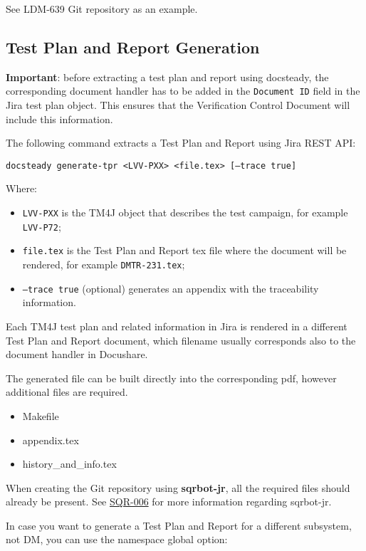 \documentclass[DM]{lsstdoc}
\begin{document}
See LDM-639 Git repository as an example.


\subsection{Test Plan and Report Generation}

\textbf{Important}: before extracting a test plan and report using docsteady,
the corresponding document handler has to be added in the \texttt{Document ID} field in the Jira test plan object.
This ensures that the Verification Control Document will include this information.

The following command extracts a Test Plan and Report using Jira REST API:

\texttt{docsteady generate-tpr <LVV-PXX> <file.tex> [--trace true]}

Where:

\begin{itemize}
\item \texttt{LVV-PXX} is the TM4J object that describes the test campaign, for example \texttt{LVV-P72};
\item \texttt{file.tex} is the Test Plan and Report tex file where the document will be rendered, for example \texttt{DMTR-231.tex};
\item \texttt{--trace true} (optional) generates an appendix with the traceability information.
\end{itemize}

Each TM4J test plan and related information in Jira is rendered in a different Test Plan and Report document,
which filename usually corresponds also to the document handler in Docushare.

The generated file can be built directly into the corresponding pdf, however additional files are required.

\begin{itemize}
\item Makefile
\item appendix.tex
\item history\_and\_info.tex
\end{itemize}

When creating the Git repository using \textbf{sqrbot-jr}, all the required files should already be present.
See \href{https://sqr-006.lsst.io/}{SQR-006} for more information regarding sqrbot-jr.

In case you want to generate a Test Plan and Report for a different subsystem, not DM, you can use the namespace global option:
\end{document}
